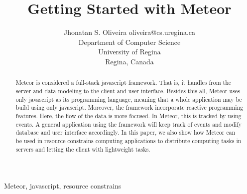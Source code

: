 \documentclass[twoside,11pt]{article}
\newcommand{\thistitle}{{Getting Started with Meteor}}
\begin{document}
\title{\thistitle}

\author{\name Jhonatan S. Oliveira \email oliveira@cs.uregina.ca \\
\addr Department of Computer Science \\
University of Regina \\ 
Regina, Canada
}


\maketitle

\begin{abstract}%
Meteor is considered a full-stack javascript framework.
That is, it handles from the server and data modeling to the client and user interface.
Besides this all, Meteor uses only javascript as its programming language, meaning that a whole application may be build using only javascript.
Moreover, the framework incorporate reactive programming features.
Here, the flow of the data is more focused.
In Meteor, this is tracked by using events.
A general application using the framework will keep track of events and modify database and user interface accordingly.
In this paper, we also show how Meteor can be used in resource constrains computing applications to distribute computing tasks in servers and letting the client with lightweight tasks.
\end{abstract}

\begin{keywords}
Meteor, javascript, resource constrains
\end{keywords}







\vskip 0.2in

\end{document}
